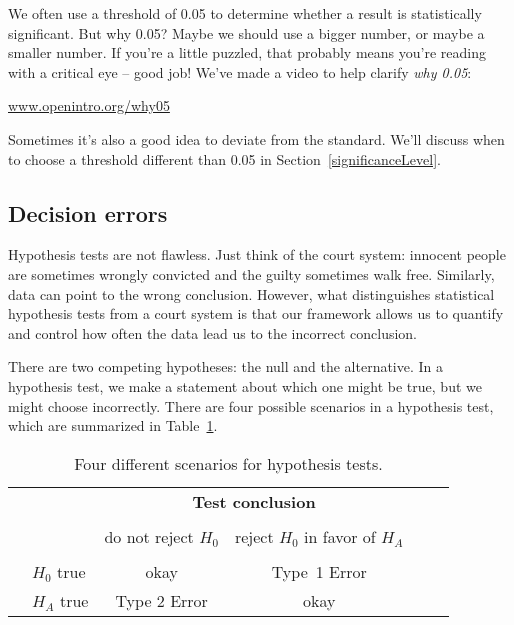 \begin{termBox}{
We often use a threshold of 0.05 to determine whether a result is statistically significant. But why 0.05? Maybe we should use a bigger number, or maybe a smaller number. If you're a little puzzled, that probably means you're reading with a critical eye -- good job! We've made a video to help clarify \emph{why 0.05}:
\begin{center}
\href{http://www.openintro.org/why05}{www.openintro.org/why05}
\end{center}
Sometimes it's also a good idea to deviate from the standard. We'll discuss when to choose a threshold different than 0.05 in Section~\ref{significanceLevel}.\vspace{0.5mm}}
\end{termBox}


\textA{\pagebreak}

\subsection{Decision errors}


Hypothesis tests are not flawless. Just think of the court system: innocent people are sometimes wrongly convicted and the guilty sometimes walk free. Similarly, data can point to the wrong conclusion. However, what distinguishes statistical hypothesis tests from a court system is that our framework allows us to quantify and control how often the data lead us to the incorrect conclusion.

There are two competing hypotheses: the null and the alternative. In a hypothesis test, we make a statement about which one might be true, but we might choose incorrectly. There are four possible scenarios in a hypothesis test, which are summarized in Table~\ref{fourHTScenarios}.

\begin{table}[ht]
\centering
\begin{tabular}{l l c c c}
& & \multicolumn{2}{c}{\textbf{Test conclusion}} \\
  \cline{3-4}
\vspace{-3.7mm} \\
& & do not reject $H_0$ &  reject $H_0$ in favor of $H_A$ &
\ \hspace{7mm} \  \\
  \cline{2-4}
\vspace{-3.7mm} \\
& $H_0$ true & okay &  Type~1 Error \\
\raisebox{1.5ex}{\textbf{Truth}} & $H_A$ true & Type 2 Error & okay \\
  \cline{2-4}
\end{tabular}
\caption{Four different scenarios for hypothesis tests.}
\label{fourHTScenarios}
\end{table}

